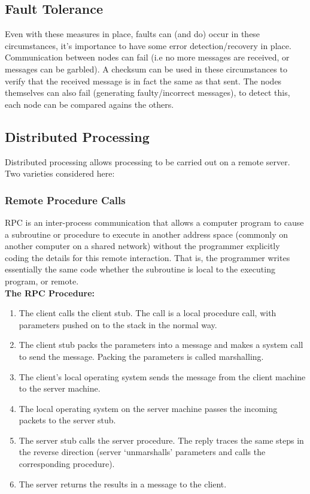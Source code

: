 \documentclass[a4paper,oneside]{report}
\begin{document}
    	\subsection{Fault Tolerance}
    	Even with these measures in place, faults can (and do) occur in these circumstances, it's importance to have some error detection/recovery in place. Communication between nodes can fail (i.e no more messages are received, or messages can be garbled). A checksum can be used in these circumstances to verify that the received message is in fact the same as that sent. The nodes themselves can also fail (generating faulty/incorrect messages), to detect this, each node can be compared agains the others.
	
  	\subsection{Distributed Processing}
  	Distributed processing allows processing to be carried out on a remote server. Two varieties considered here:
  	
	  	\subsubsection{Remote Procedure Calls}
		RPC is an inter-process communication that allows a computer program to cause a subroutine or procedure to execute in another address space (commonly on another computer on a shared network) without the programmer explicitly coding the details for this remote interaction. That is, the programmer writes essentially the same code whether the subroutine is local to the executing program, or remote.\\
		
		\noindent \textbf{The RPC Procedure:}
		\begin{enumerate}
			\item The client calls the client stub. The call is a local procedure call, with parameters pushed on to the stack in the normal way.
			\item The client stub packs the parameters into a message and makes a system call to send the message. Packing the parameters is called marshalling.
			\item The client's local operating system sends the message from the client machine to the server machine.
			\item The local operating system on the server machine passes the incoming packets to the server stub.
			\item The server stub calls the server procedure. The reply traces the same steps in the reverse direction (server `unmarshalls' parameters and calls the corresponding procedure).
			\item The server returns the results in a message to the client.
		\end{enumerate}
		
\end{document}
